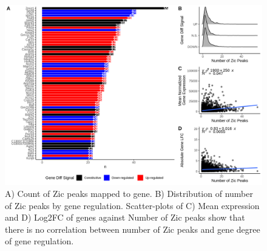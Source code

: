 \documentclass[fleqn,10pt,twocolumn]{wlscirep}
\begin{document}
\begin{figure}[ht]
\centering
\includegraphics[width=.90\linewidth]{../figures/supp_figure3.png}
\caption{ A) Count of Zic peaks mapped to gene. B) Distribution of number of Zic peaks by gene regulation.  Scatter-plots of C) Mean expression and D) Log2FC of genes against Number of Zic peaks show that there is no correlation between number of Zic peaks and gene degree of gene regulation. }
\label{fig:nPeakstoGenes}
\end{figure}
\end{document}
